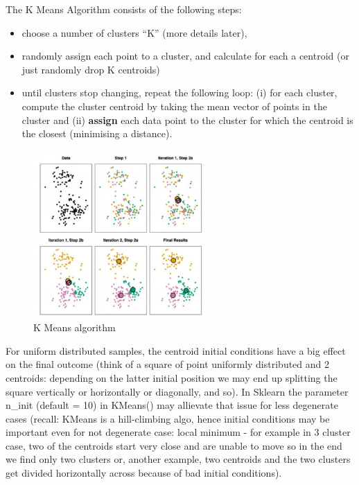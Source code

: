 \documentclass[11pt]{article}
\begin{document}
The K Means Algorithm consists of the following steps:
\begin{itemize}
	\item choose a number of clusters “K” (more details later),
	\item randomly assign each point to a cluster, and calculate for each a centroid (or just randomly drop K centroids)
	\item until clusters stop changing, repeat the following loop: (i) for each cluster, compute the cluster centroid by taking the mean vector of points in the cluster and (ii) \textbf{assign} each data point to the cluster for which the centroid is the closest (minimising a distance).
\end{itemize}

\begin{figure}[htbp] 
	\centering
	\includegraphics[width=0.6\textwidth]{pics/k_means_algo_loop}
	\caption{K Means algorithm} 
\end{figure}
For uniform distributed samples, the centroid initial conditions have a big effect on the final outcome (think of a square of point uniformly distributed and 2 centroids: depending on the latter initial position we may end up splitting the square vertically or horizontally or diagonally, and so). In Sklearn the parameter n\_init (default = 10) in KMeans() may allievate that issue for less degenerate cases (recall: KMeans is a hill-climbing algo, hence initial conditions may be important even for not degenerate case: local minimum - for example in 3 cluster case, two of the centroids start very close and are unable to move so in the end we find only two clusters or, another example, two centroids and the two clusters get divided horizontally across because of bad initial conditions).
\end{document}
